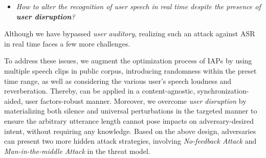 \begin{itemize}[leftmargin=*]
\item \textit{How to alter the recognition of user speech in real time despite the presence of \textbf{user disruption}?}
\end{itemize}


Although we have bypassed \textit{user auditory}, realizing such an attack against ASR in real time faces a few more challenges. 

To address these issues, we augment the optimization process of IAPs by using multiple speech clips in public corpus, introducing randomness within the preset time range, as well as considering the various user's speech loudness and reverberation. Thereby, \alias can be applied in a content-agnostic, synchronization-aided, user factors-robust manner. Moreover, we overcome \textit{user disruption} by materializing both silence and universal perturbations in the targeted manner to ensure the arbitrary utterance length cannot pose impacts on adversary-desired intent, without requiring any knowledge.
Based on the above design, adversaries can present two more hidden attack strategies, involving \textit{No-feedback Attack} and \textit{Man-in-the-middle Attack} in the threat model.


